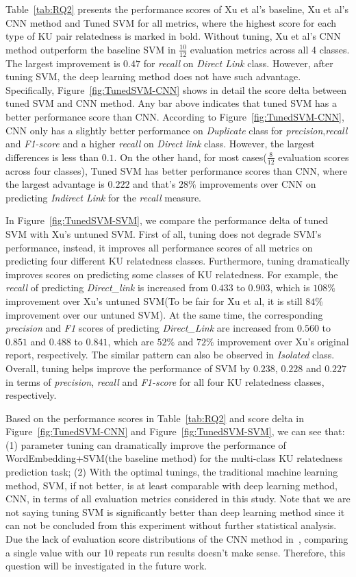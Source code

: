 \documentclass[sigconf,review, anonymous]{acmart}
\theoremstyle{break}
\newcommand{\fig}[1]{Figure~\ref{fig:#1}}
\newcommand{\tab}[1]{Table~\ref{tab:#1}}
\begin{document}
\tab{RQ2} presents the performance scores of  Xu et al's baseline, Xu et al's CNN method and Tuned SVM 
for all metrics, where the highest score for each type of KU pair
relatedness is marked in bold.  Without tuning, Xu et al's CNN method outperform
the baseline SVM in $\frac{10}{12}$ evaluation metrics across all 4 classes. 
The largest improvement is $0.47$ for {\it recall} on {\it Direct Link} class. However, after tuning SVM, the deep learning method does  not have such advantage. Specifically, \fig{TunedSVM-CNN} shows in detail the score delta between tuned SVM and CNN method. Any bar above indicates that tuned SVM has a better performance score than CNN.
According to \fig{TunedSVM-CNN}, CNN only has a slightly better performance on {\it Duplicate} class for {\it precision},{\it recall} and {\it F1-score} and a higher {\it recall} on {\it Direct link} class. However,
the largest differences is less than $0.1$. On the other hand, for most cases($\frac{8}{12}$ evaluation scores across four classes), Tuned SVM has better performance scores than CNN, where the largest advantage is $0.222$ and that's
$28\%$ improvements over CNN on predicting {\it Indirect Link} for the {\it recall} measure.

In \fig{TunedSVM-SVM}, we compare the performance delta of tuned SVM with Xu's untuned SVM. First of all,
tuning does not degrade SVM's performance, instead, it improves all performance scores of all metrics on predicting four different KU relatedness classes.
Furthermore, tuning dramatically improves scores on predicting some classes of KU relatedness. For example, the {\it recall} of predicting {\it Direct\_link} is increased from $0.433$ to $0.903$, which is $108\%$ improvement over Xu's untuned SVM(To be fair for Xu et al, it is still $84\%$ improvement over our untuned SVM). At the same time, the corresponding {\it precision} and {\it F1} scores of predicting {\it Direct\_Link} are increased from $0.560$ to $0.851$ and $0.488$ to $0.841$,  which are $52\%$ and $72\%$ improvement over Xu's original report, respectively.
The similar pattern can also be observed in {\it Isolated} class. Overall, tuning helps improve the performance
of SVM by $0.238$, $0.228$ and $0.227$ in terms of {\it precision}, {\it recall} and {\it F1-score}
for all four KU relatedness classes, respectively.



 Based on the performance scores in \tab{RQ2} and score delta in \fig{TunedSVM-CNN} and \fig{TunedSVM-SVM},
 we can see that: (1) parameter tuning can dramatically improve the performance of WordEmbedding+SVM(the baseline method) for the multi-class KU relatedness prediction task;
 (2) With the optimal tunings, the traditional machine learning method, SVM, if not better, is at least comparable 
 with deep learning method, CNN, in terms of all evaluation metrics considered in this study. Note that we are not saying tuning SVM is significantly
 better than deep learning method since it can not be concluded from this experiment without further statistical analysis.
 Due the lack of evaluation score distributions of the CNN method in~\cite{xu2016predicting}, comparing a single value with our 10 repeats run results doesn't make sense. Therefore, this question will be investigated in the future work.
 
\end{document}
